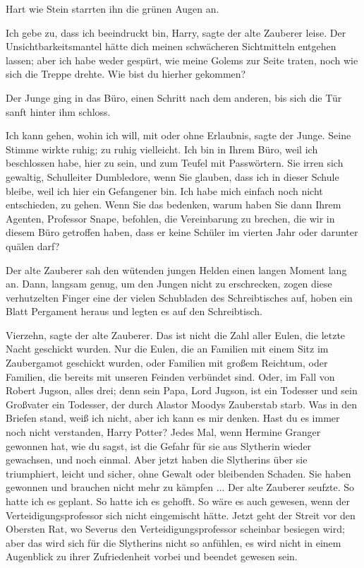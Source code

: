 Hart wie Stein starrten ihn die grünen Augen an.

\glqq{}Ich gebe zu, dass ich beeindruckt bin, Harry\grqq{}, sagte der alte
Zauberer leise. \glqq{}Der Unsichtbarkeitsmantel hätte dich meinen schwächeren
Sichtmitteln entgehen lassen; aber ich habe weder gespürt, wie meine Golems zur
Seite traten, noch wie sich die Treppe drehte. Wie bist du hierher
gekommen?\grqq{}

Der Junge ging in das Büro, einen Schritt nach dem anderen, bis sich die Tür
sanft hinter ihm schloss.

\glqq{}Ich kann gehen, wohin ich will, mit oder ohne Erlaubnis\grqq{}, sagte der
Junge. Seine Stimme wirkte ruhig; zu ruhig vielleicht. \glqq{}Ich bin in Ihrem
Büro, weil ich beschlossen habe, hier zu sein, und zum Teufel mit Passwörtern.
Sie irren sich gewaltig, Schulleiter Dumbledore, wenn Sie glauben, dass ich in
dieser Schule bleibe, weil ich hier ein Gefangener bin. Ich habe mich einfach
noch nicht entschieden, zu gehen. Wenn Sie das bedenken, warum haben Sie dann
Ihrem Agenten, Professor Snape, befohlen, die Vereinbarung zu brechen, die wir
in diesem Büro getroffen haben, dass er keine Schüler im vierten Jahr oder
darunter quälen darf?\grqq{}

Der alte Zauberer sah den wütenden jungen Helden einen langen Moment lang an.
Dann, langsam genug, um den Jungen nicht zu erschrecken, zogen diese
verhutzelten Finger eine der vielen Schubladen des Schreibtisches auf, hoben ein
Blatt Pergament heraus und legten es auf den Schreibtisch.

\glqq{}Vierzehn\grqq{}, sagte der alte Zauberer. \glqq{}Das ist nicht die Zahl
aller Eulen, die letzte Nacht geschickt wurden. Nur die Eulen, die an Familien
mit einem Sitz im Zaubergamot geschickt wurden, oder Familien mit großem
Reichtum, oder Familien, die bereits mit unseren Feinden verbündet sind. Oder,
im Fall von Robert Jugson, alles drei; denn sein Papa, Lord Jugson, ist ein
Todesser und sein Großvater ein Todesser, der durch Alastor Moodys Zauberstab
starb. Was in den Briefen stand, weiß ich nicht, aber ich kann es mir denken.
Hast du es immer noch nicht verstanden, Harry Potter? Jedes Mal, wenn Hermine
Granger gewonnen hat, wie du sagst, ist die Gefahr für sie aus Slytherin wieder
gewachsen, und noch einmal. Aber jetzt haben die Slytherins über sie
triumphiert, leicht und sicher, ohne Gewalt oder bleibenden Schaden. Sie haben
gewonnen und brauchen nicht mehr zu kämpfen ...\grqq{} Der alte Zauberer seufzte.
\glqq{}So hatte ich es geplant. So hatte ich es gehofft. So wäre es auch gewesen,
wenn der Verteidigungsprofessor sich nicht eingemischt hätte. Jetzt geht der
Streit vor den Obersten Rat, wo Severus den Verteidigungsprofessor scheinbar
besiegen wird; aber das wird sich für die Slytherins nicht so anfühlen, es wird
nicht in einem Augenblick zu ihrer Zufriedenheit vorbei und beendet gewesen
sein.\grqq{}

